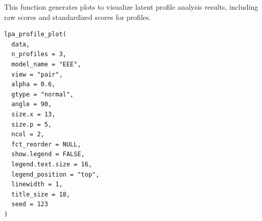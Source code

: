 \documentclass[a4paper]{book}
\begin{document}
%
\begin{Description}
This function generates plots to visualize latent profile analysis results, including raw scores and standardized scores for profiles.
\end{Description}
%
\begin{Usage}
\begin{verbatim}
lpa_profile_plot(
  data,
  n_profiles = 3,
  model_name = "EEE",
  view = "pair",
  alpha = 0.6,
  gtype = "normal",
  angle = 90,
  size.x = 13,
  size.p = 5,
  ncol = 2,
  fct_reorder = NULL,
  show.legend = FALSE,
  legend.text.size = 16,
  legend_position = "top",
  linewidth = 1,
  title_size = 18,
  seed = 123
)
\end{verbatim}
\end{Usage}
%
\end{document}
